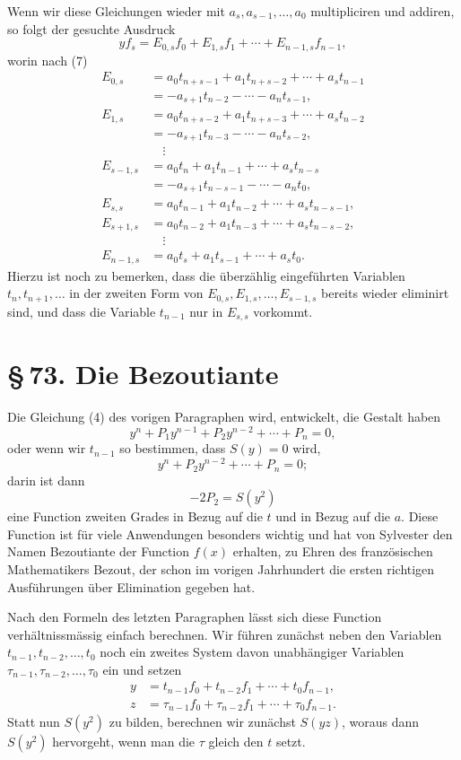 \documentclass[11pt]{article}
\providecommand{\sect}[2]{\section*{\S\,#1. #2}}
\begin{document}
Wenn wir diese Gleichungen wieder mit $a_s,a_{s-1},\ldots,a_0$ multipliciren und addiren, so folgt der gesuchte Ausdruck
\[
 yf_s=E_{0,s}f_0+E_{1,s}f_1+\cdots+E_{n-1,s}f_{n-1},
\]
worin nach (7)
\begin{equation}
\begin{aligned}
E_{0,s}&=a_0t_{n+s-1}+a_1t_{n+s-2}+\cdots+a_st_{n-1}\\
&= -a_{s+1}t_{n-2}-\cdots-a_nt_{s-1},\\[0.25em]
E_{1,s}&=a_0t_{n+s-2}+a_1t_{n+s-3}+\cdots+a_st_{n-2}\\
&= -a_{s+1}t_{n-3}-\cdots-a_nt_{s-2},\\
&\quad\vdots\\
E_{s-1,s}&=a_0t_n+a_1t_{n-1}+\cdots+a_st_{n-s}\\
&= -a_{s+1}t_{n-s-1}-\cdots-a_nt_0,\\[0.25em]
E_{s,s}&=a_0t_{n-1}+a_1t_{n-2}+\cdots+a_st_{n-s-1},\\
E_{s+1,s}&=a_0t_{n-2}+a_1t_{n-3}+\cdots+a_st_{n-s-2},\\
&\quad\vdots\\
E_{n-1,s}&=a_0t_s+a_1t_{s-1}+\cdots+a_st_0.
\end{aligned}
\tag{9}
\end{equation}
Hierzu ist noch zu bemerken, dass die überzählig eingeführten Variablen $t_n,t_{n+1},\ldots$ in der zweiten Form von $E_{0,s},E_{1,s},\ldots,E_{s-1,s}$ bereits wieder eliminirt sind, und dass die Variable $t_{n-1}$ nur in $E_{s,s}$ vorkommt.



\sect{73}{Die Bezoutiante}

Die Gleichung (4) des vorigen Paragraphen wird, entwickelt, die Gestalt haben
\[
 y^n+P_1y^{n-1}+P_2y^{n-2}+\cdots+P_n=0,
\]
oder wenn wir $t_{n-1}$ so bestimmen, dass $S(y)=0$ wird,
\begin{equation}
 y^n+P_2y^{n-2}+\cdots+P_n=0;
\tag{1}
\end{equation}
darin ist dann
\[
 -2P_2=S(y^2)
\]
eine Function zweiten Grades in Bezug auf die $t$ und in Bezug auf die $a$. Diese Function ist für viele Anwendungen besonders wichtig und hat von Sylvester den Namen Bezoutiante der Function $f(x)$ erhalten, zu Ehren des französischen Mathematikers Bezout, der schon im vorigen Jahrhundert die ersten richtigen Ausführungen über Elimination gegeben hat.

Nach den Formeln des letzten Paragraphen lässt sich diese Function verhältnissmässig einfach berechnen. Wir führen zunächst neben den Variablen $t_{n-1},t_{n-2},\ldots,t_0$ noch ein zweites System davon unabhängiger Variablen $\tau_{n-1},\tau_{n-2},\ldots,\tau_0$ ein und setzen
\begin{equation}
\begin{aligned}
 y&=t_{n-1}f_0+t_{n-2}f_1+\cdots+t_0f_{n-1},\\
 z&=\tau_{n-1}f_0+\tau_{n-2}f_1+\cdots+\tau_0f_{n-1}.
\end{aligned}
\tag{2}
\end{equation}
Statt nun $S(y^2)$ zu bilden, berechnen wir zunächst $S(yz)$, woraus dann $S(y^2)$ hervorgeht, wenn man die $\tau$ gleich den $t$ setzt.
\end{document}
